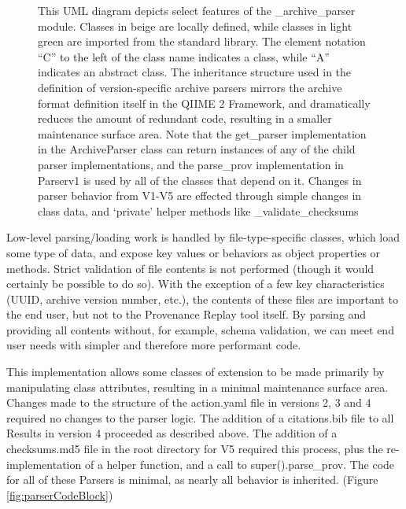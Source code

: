 \begin{figure}[htp]
\begin{minipage}[c]{0.5\textwidth}
    \end{minipage}\hfill
    \begin{minipage}[c]{0.45\textwidth}
\caption[UML Class diagram of the Version-specific Archive Parsers]%
{This UML diagram depicts select features of the \_archive\_parser module. Classes
in beige are locally defined, while classes in light green are imported from the
standard library. The element notation “C” to the left of the class name
indicates a class, while “A” indicates an abstract class. The inheritance
structure used in the definition of version-specific archive parsers mirrors the
archive format definition itself in the QIIME 2 Framework, and dramatically
reduces the amount of redundant code, resulting in a smaller maintenance surface
area. Note that the get\_parser implementation in the ArchiveParser class can
return instances of any of the child parser implementations, and the parse\_prov
implementation in Parserv1 is used by all of the classes that depend on it.
Changes in parser behavior from V1-V5 are effected through simple changes in
class data, and ‘private’ helper methods like \_validate\_checksums}
    \end{minipage}
\end{figure}

Low-level parsing/loading work is handled by file-type-specific classes, which
load some type of data, and expose key values or behaviors as object properties
or methods. Strict validation of file contents is not performed (though it would
certainly be possible to do so). With the exception of a few key characteristics
(UUID, archive version number, etc.), the contents of these files are important
to the end user, but not to the Provenance Replay tool itself. By parsing and
providing all contents without, for example, schema validation, we can meet end
user needs with simpler and therefore more performant code.

This implementation allows some classes of extension to be made primarily by
manipulating class attributes, resulting in a minimal maintenance surface area.
Changes made to the structure of the action.yaml file in versions 2, 3 and 4
required no changes to the parser logic. The addition of a citations.bib file to
all Results in version 4 proceeded as described above. The addition of a
checksums.md5 file in the root directory for V5 required this process, plus the
re-implementation of a helper function, and a call to super().parse\_prov. The
code for all of these Parsers is minimal, as nearly all behavior is inherited. 
(Figure \ref{fig:parserCodeBlock})

